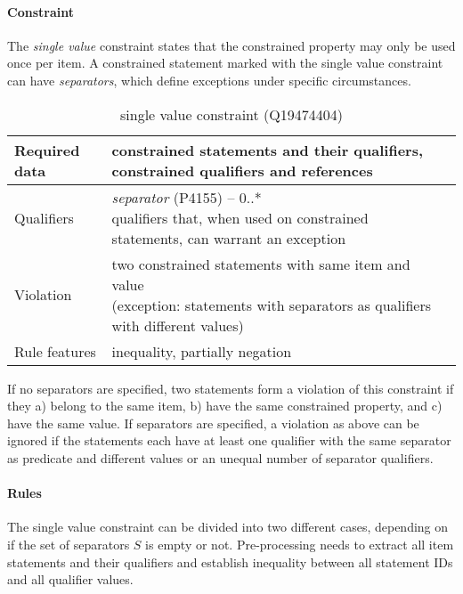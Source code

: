 \documentclass[hyperref,bachelorofscience,fleqn]{cgvpub}
\begin{document}
\paragraph{Constraint}
The \emph{single value} constraint states that the constrained property may only be used once per item. A constrained statement marked with the single value constraint can have \emph{separators}, which define exceptions under specific circumstances.
\begin{table}[H]
\caption{single value constraint (Q19474404)}
\begin{tabularx}{\textwidth}{ ll X}
\hline
Required data & constrained statements and their qualifiers, constrained qualifiers and references \\
\hline
Qualifiers & \makecell{\emph{separator} (P4155) -- 0..* \\ qualifiers that, when used on constrained statements, can warrant an exception} \\
\hline
Violation & \makecell{two constrained statements with same item and value \\ (exception: statements with separators as qualifiers with different values)} \\
\hline
Rule features & inequality, partially negation \\
\hline
\end{tabularx}
\end{table}

If no separators are specified, two statements form a violation of this constraint if they a) belong to the same item, b) have the same constrained property, and c) have the same value.
If separators are specified, a violation as above can be ignored if the statements each have at least one qualifier with the same separator as predicate and different values or an unequal number of separator qualifiers.

\paragraph{Rules}
The single value constraint can be divided into two different cases, depending on if the set of separators \(S\) is empty or not. Pre-processing needs to extract all item statements and their qualifiers and establish inequality between all statement IDs and all qualifier values.
\end{document}

